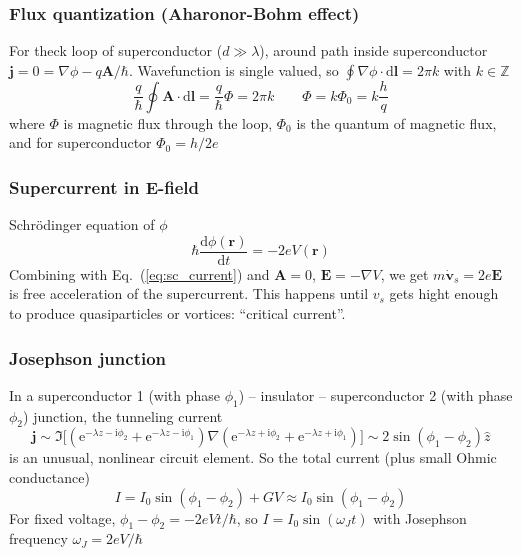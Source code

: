 \documentclass[11pt,letterpaper]{article}
\numberwithin{equation}{section} %
\renewcommand*{\vec}[1]{\bm{#1}}
\newcommand{\dif}{\mathrm d}
\newcommand\mi{\mathrm{i}}
\newcommand\e{\mathrm{e}}
\begin{document}
\subsubsection{Flux quantization (Aharonor-Bohm effect)}
\label{ssub:flux_quantization}
For theck loop of superconductor ($d\gg\lambda$), around path inside
superconductor $\vec j = 0 = \nabla\phi - q\vec A/\hbar$. Wavefunction is
single valued, so $\oint\nabla\phi\cdot\dif\vec l = 2\pi k$ with $k\in\mathbb Z$
\begin{equation}\label{eq:phi0}
	\frac q\hbar\oint\vec A\cdot\dif\vec l = \frac q\hbar \Phi = 2\pi k
	\qquad 
	\Phi = k\Phi_0 = k\frac hq
\end{equation}
where $\Phi$ is magnetic flux through the loop, $\Phi_0$ is the quantum of
magnetic flux, and for superconductor $\Phi_0 = h/2e$ 

\subsubsection[supercurrent in E-field]{Supercurrent in $\vec E$-field}
\label{ssub:super_current}
Schr\"odinger equation of $\phi$
\begin{equation}
	\hbar\frac{\dif\phi(\vec r)}{\dif t} = -2eV(\vec r)
\end{equation}
Combining with Eq.~(\ref{eq:sc_current}) and $\vec A=0$, $\vec E = -\nabla
V$, we get $m\dot{\vec v}_s = 2e\vec E$ is free acceleration of the
supercurrent. This happens until $v_s$ gets hight enough to produce
quasiparticles or vortices: ``critical current''. 

\subsubsection{Josephson junction}
\label{ssub:josephson_junction}
In a superconductor 1 (with phase $\phi_1$) -- insulator -- superconductor 2
(with phase $\phi_2$) junction, the tunneling current
\begin{equation}
	\vec j\sim \Im \big[ (\e^{-\lambda z - \mi\phi_2} + 
			\e^{-\lambda z - \mi\phi_1})\nabla (\e^{-\lambda z + \mi\phi_2} + 
		\e^{-\lambda z + \mi\phi_1})\big]
		\sim 2\sin(\phi_1 - \phi_2)\hat z 
\end{equation}
is an unusual, nonlinear circuit element. So the total current (plus small
Ohmic conductance)
\begin{equation}
	I = I_0\sin(\phi_1 - \phi_2) + GV \approx I_0\sin(\phi_1 - \phi_2)
\end{equation}
For fixed voltage, $\phi_1 - \phi_2 = -2eVt/\hbar$, so $I = I_0\sin(\omega_J
t)$ with Josephson frequency $\omega_J = 2eV/\hbar$
\end{document}
